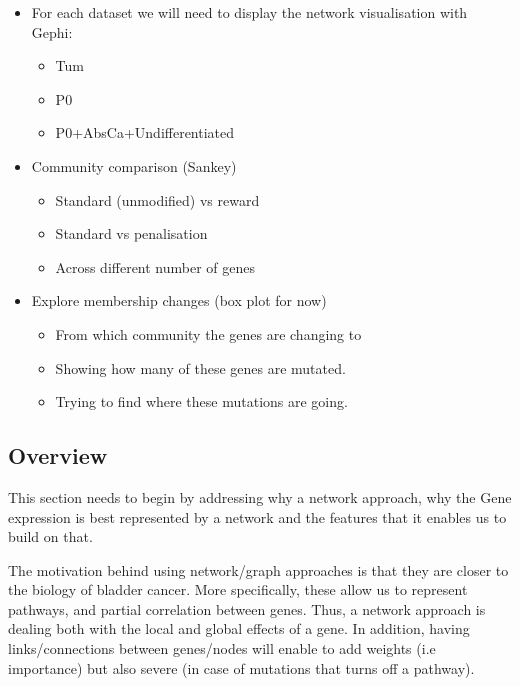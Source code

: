 \begin{itemize}
    \item For each dataset we will need to display the network visualisation with Gephi:
          \begin{itemize}
              \item Tum
              \item P0
              \item P0+AbsCa+Undifferentiated
          \end{itemize}
\end{itemize}

\begin{itemize}
    \item Community comparison (Sankey)
          \begin{itemize}
              \item Standard (unmodified) vs reward
              \item Standard vs penalisation
              \item Across different number of genes
          \end{itemize}
\end{itemize}

\begin{itemize}
    \item Explore membership changes (box plot \- for now)
          \begin{itemize}
              \item From which community the genes are changing to
              \item Showing how many of these genes are mutated.
              \item Trying to find where these mutations are going.
          \end{itemize}
\end{itemize}


\subsection{Overview}

This section needs to begin by addressing why a network approach, why the Gene expression is best represented by a network and the features that it enables us to build on that.

% 
The motivation behind using network/graph approaches is that they are closer to the biology of bladder cancer. More specifically, these allow us to represent pathways, and partial correlation between genes. Thus, a network approach is dealing both with the local and global effects of a gene. In addition, having links/connections between genes/nodes will enable to add weights (i.e importance) but also severe (in case of mutations that turns off a pathway).

